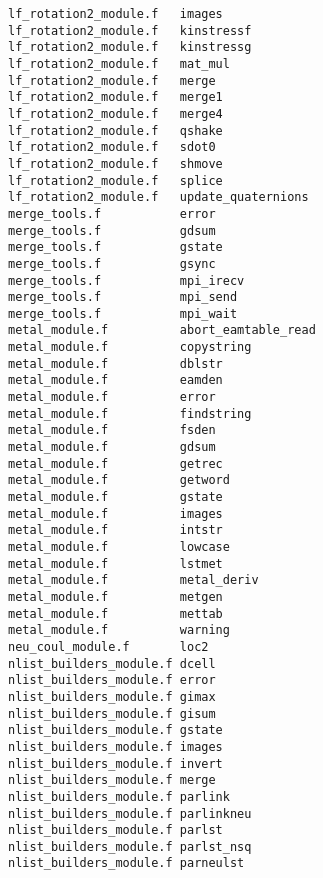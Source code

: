\begin{verbatim}
lf_rotation2_module.f   images                    
lf_rotation2_module.f   kinstressf                
lf_rotation2_module.f   kinstressg                
lf_rotation2_module.f   mat_mul                   
lf_rotation2_module.f   merge                     
lf_rotation2_module.f   merge1                    
lf_rotation2_module.f   merge4                    
lf_rotation2_module.f   qshake                    
lf_rotation2_module.f   sdot0                     
lf_rotation2_module.f   shmove                    
lf_rotation2_module.f   splice                    
lf_rotation2_module.f   update_quaternions        
merge_tools.f           error                     
merge_tools.f           gdsum                     
merge_tools.f           gstate                    
merge_tools.f           gsync                     
merge_tools.f           mpi_irecv                 
merge_tools.f           mpi_send                  
merge_tools.f           mpi_wait                  
metal_module.f          abort_eamtable_read       
metal_module.f          copystring                
metal_module.f          dblstr                    
metal_module.f          eamden                    
metal_module.f          error                     
metal_module.f          findstring            
metal_module.f          fsden                 
metal_module.f          gdsum                     
metal_module.f          getrec                    
metal_module.f          getword                   
metal_module.f          gstate                    
metal_module.f          images                    
metal_module.f          intstr                    
metal_module.f          lowcase                   
metal_module.f          lstmet                    
metal_module.f          metal_deriv               
metal_module.f          metgen                    
metal_module.f          mettab                    
metal_module.f          warning                   
neu_coul_module.f       loc2                      
nlist_builders_module.f dcell                     
nlist_builders_module.f error                     
nlist_builders_module.f gimax                     
nlist_builders_module.f gisum                     
nlist_builders_module.f gstate                    
nlist_builders_module.f images                    
nlist_builders_module.f invert                    
nlist_builders_module.f merge                     
nlist_builders_module.f parlink                   
nlist_builders_module.f parlinkneu                
nlist_builders_module.f parlst                    
nlist_builders_module.f parlst_nsq                
nlist_builders_module.f parneulst                 

\end{verbatim}
